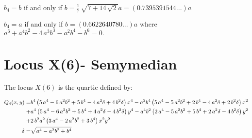 \documentclass[11pt]{amsart}
\theoremstyle{plain}
\theoremstyle{definition}
\begin{document}
 $  b_4=b $  if and only if  $b=\frac 17 \,\sqrt {7+14\,\sqrt {2}}a=(0.7395391544...)a$
 
  $  b_4=a $  if and only if  $b=(0.6622640780...)a$
  where  
   ${a}^{6}+{a}^{4}{b}^{2}-4\,{a}^{3}{b}^{3}-{a}^{2}{b}^{4}-{b}^{6}=0.$
 
 
% 
% 
 
  \section{Locus X(6)- Semymedian}
  
  
 The locus $X(6)$ is the quartic defined by:
 
 
 \[\aligned Q_4(x,y)=&
 {b}^{4} \left( 5\,{a}^{4}-6\,{a}^{2}{b}^{2}+5\,{b}^{4}-4\,{a}^{2}
 \delta+4\,{b}^{2}\delta \right) {x}^{4}-{a}^{2}{b}^{4} \left( 5\,{a}^{
 	4}-5\,{a}^{2}{b}^{2}+2\,{b}^{4}-4\,{a}^{2}\delta+2\,{b}^{2}\delta
 \right) {x}^{2}\\
 +&{a}^{4} \left( 5\,{a}^{4}-6\,{a}^{2}{b}^{2}+5\,{b}^{4
 }+4\,{a}^{2}\delta-4\,{b}^{2}\delta \right) {y}^{4}-{a}^{4}{b}^{2}
 \left( 2\,{a}^{4}-5\,{a}^{2}{b}^{2}+5\,{b}^{4}+2\,{a}^{2}\delta-4\,{b
 }^{2}\delta \right) {y}^{2}\\
+&2\,{b}^{2}{a}^{2} \left( 3\,{a}^{4}-2\,{a}
 ^{2}{b}^{2}+3\,{b}^{4} \right) {x}^{2}{y}^{2}\\
 \delta=&\sqrt {{a}^{4}-{a}^{2}{b}^{2}+{b}^{4}}\endaligned
 \]
 
\end{document}
